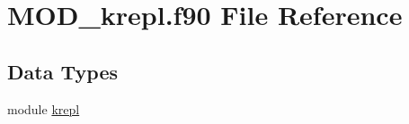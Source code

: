 \hypertarget{MOD__krepl_8f90}{\section{M\-O\-D\-\_\-krepl.\-f90 File Reference}
\label{MOD__krepl_8f90}
}
\subsection*{Data Types}
\begin{DoxyCompactItemize}
\item 
module \hyperlink{classkrepl}{krepl}
\end{DoxyCompactItemize}
